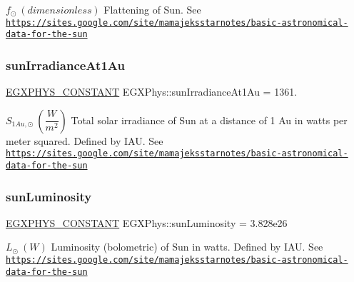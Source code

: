 $f_{\odot} \ (dimensionless)$ Flattening of Sun. See \href{https://sites.google.com/site/mamajeksstarnotes/basic-astronomical-data-for-the-sun}{\tt https\+://sites.\+google.\+com/site/mamajeksstarnotes/basic-\/astronomical-\/data-\/for-\/the-\/sun} \mbox{\label{group___e_g_x_phys-_constants-_astrophysics-_solar_system-_sun-_bulk_ga7632e3eda212f81ae257daab783a1a3f}} 
\subsubsection{\texorpdfstring{sun\+Irradiance\+At1\+Au}{sunIrradianceAt1Au}}
{\footnotesize\ttfamily \mbox{\hyperlink{group___e_g_x_phys-_constants-_macros_ga76980d288494ce1714c9ac68a95ba702}{E\+G\+X\+P\+H\+Y\+S\+\_\+\+C\+O\+N\+S\+T\+A\+NT}} E\+G\+X\+Phys\+::sun\+Irradiance\+At1\+Au = 1361.}

$ S_{1Au,\odot} \ (\dfrac{W}{m^2})$ Total solar irradiance of Sun at a distance of 1 Au in watts per meter squared. Defined by I\+AU. See \href{https://sites.google.com/site/mamajeksstarnotes/basic-astronomical-data-for-the-sun}{\tt https\+://sites.\+google.\+com/site/mamajeksstarnotes/basic-\/astronomical-\/data-\/for-\/the-\/sun} \mbox{\label{group___e_g_x_phys-_constants-_astrophysics-_solar_system-_sun-_bulk_gaac188526cc9b051a26372e1a3b5b66b7}} 
\subsubsection{\texorpdfstring{sun\+Luminosity}{sunLuminosity}}
{\footnotesize\ttfamily \mbox{\hyperlink{group___e_g_x_phys-_constants-_macros_ga76980d288494ce1714c9ac68a95ba702}{E\+G\+X\+P\+H\+Y\+S\+\_\+\+C\+O\+N\+S\+T\+A\+NT}} E\+G\+X\+Phys\+::sun\+Luminosity = 3.\+828e26}

$ L_{\odot} \ (W)$ Luminosity (bolometric) of Sun in watts. Defined by I\+AU. See \href{https://sites.google.com/site/mamajeksstarnotes/basic-astronomical-data-for-the-sun}{\tt https\+://sites.\+google.\+com/site/mamajeksstarnotes/basic-\/astronomical-\/data-\/for-\/the-\/sun} \mbox{\label{group___e_g_x_phys-_constants-_astrophysics-_solar_system-_sun-_bulk_ga4b0d14718fcf75def83eec7f17d86268}} 

